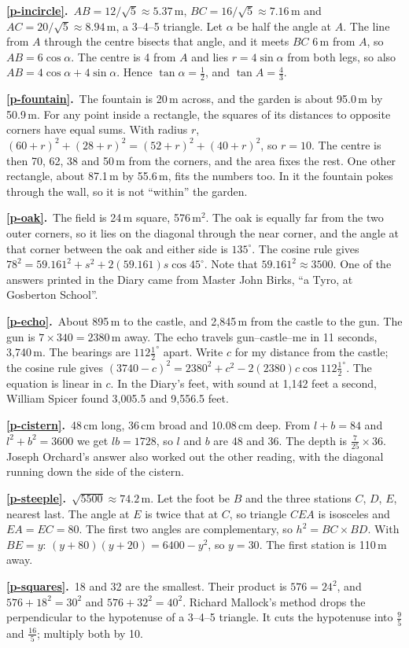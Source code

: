 \documentclass[11pt,a4paper]{article}
\newcommand{\ans}[2]{\par\smallskip\noindent\textbf{\ref{#1}.}\ #2}
\begin{document}
\ans{p-incircle}{$AB = 12/\sqrt5 \approx 5.37$\,m, $BC = 16/\sqrt5 \approx 7.16$\,m and
$AC = 20/\sqrt5 \approx 8.94$\,m, a 3--4--5 triangle. Let $\alpha$ be half the angle at
$A$. The line from $A$ through the centre bisects that angle, and it meets $BC$ 6\,m
from $A$, so $AB = 6\cos\alpha$. The centre is 4 from $A$ and lies $r = 4\sin\alpha$
from both legs, so also $AB = 4\cos\alpha + 4\sin\alpha$. Hence $\tan\alpha = \tfrac12$,
and $\tan A = \tfrac43$.}
\ans{p-fountain}{The fountain is 20\,m across, and the garden is about 95.0\,m by
50.9\,m. For any point inside a rectangle, the squares of its distances to opposite
corners have equal sums. With radius $r$,
$(60 + r)^2 + (28 + r)^2 = (52 + r)^2 + (40 + r)^2$, so $r = 10$. The centre is then 70,
62, 38 and 50\,m from the corners, and the area fixes the rest. One other rectangle,
about 87.1\,m by 55.6\,m, fits the numbers too. In it the fountain pokes through the
wall, so it is not ``within'' the garden.}
\ans{p-oak}{The field is 24\,m square, 576\,m$^2$. The oak is equally far from the two
outer corners, so it lies on the diagonal through the near corner, and the angle at
that corner between the oak and either side is $135^\circ$. The cosine rule gives
$78^2 = 59.161^2 + s^2 + 2(59.161)s\cos45^\circ$. Note that $59.161^2 \approx 3500$. One of
the answers printed in the Diary came from Master John Birks, ``a Tyro, at Gosberton
School''.}
\ans{p-echo}{About 895\,m to the castle, and 2,845\,m from the castle to the gun. The gun
is $7\times340 = 2380$\,m away. The echo travels gun--castle--me in 11 seconds,
3,740\,m. The bearings are $112\tfrac12^\circ$ apart. Write $c$ for my distance from the
castle; the cosine rule gives $(3740 - c)^2 = 2380^2 + c^2 - 2(2380)c\cos112\tfrac12^\circ$.
The equation is linear in $c$. In the Diary's feet, with sound at 1,142 feet a second,
William Spicer found 3,005.5 and 9,556.5 feet.}
\ans{p-cistern}{48\,cm long, 36\,cm broad and 10.08\,cm deep. From $l + b = 84$ and
$l^2 + b^2 = 3600$ we get $lb = 1728$, so $l$ and $b$ are 48 and 36. The depth is
$\tfrac7{25}\times36$. Joseph Orchard's answer also worked out the other reading, with the
diagonal running down the side of the cistern.}
\ans{p-steeple}{$\sqrt{5500} \approx 74.2$\,m. Let the foot be $B$ and the three stations
$C$, $D$, $E$, nearest last. The angle at $E$ is twice that at $C$, so triangle $CEA$ is
isosceles and $EA = EC = 80$. The first two angles are complementary, so
$h^2 = BC\times BD$. With $BE = y$: $(y + 80)(y + 20) = 6400 - y^2$, so $y = 30$. The first
station is 110\,m away.}
\ans{p-squares}{18 and 32 are the smallest. Their product is $576 = 24^2$, and
$576 + 18^2 = 30^2$ and $576 + 32^2 = 40^2$. Richard Mallock's method drops the
perpendicular to the hypotenuse of a 3--4--5 triangle. It cuts the hypotenuse into
$\tfrac95$ and $\tfrac{16}5$; multiply both by 10.}
\end{document}
